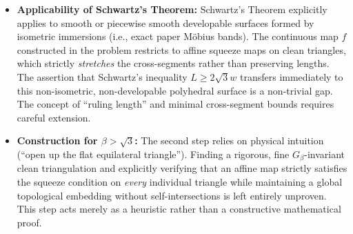 \documentclass[12pt]{article}
\begin{document}
\begin{itemize}
    \item \textbf{Applicability of Schwartz's Theorem:} Schwartz's Theorem explicitly applies to smooth or piecewise smooth developable surfaces formed by isometric immersions (i.e., exact paper M\"obius bands). The continuous map $f$ constructed in the problem restricts to affine squeeze maps on clean triangles, which strictly \emph{stretches} the cross-segments rather than preserving lengths. The assertion that Schwartz's inequality $L \ge 2\sqrt{3}w$ transfers immediately to this non-isometric, non-developable polyhedral surface is a non-trivial gap. The concept of ``ruling length'' and minimal cross-segment bounds requires careful extension.
    \item \textbf{Construction for $\beta > \sqrt{3}$:} The second step relies on physical intuition (``open up the flat equilateral triangle''). Finding a rigorous, fine $G_{\beta}$-invariant clean triangulation and explicitly verifying that an affine map strictly satisfies the squeeze condition on \emph{every} individual triangle while maintaining a global topological embedding without self-intersections is left entirely unproven. This step acts merely as a heuristic rather than a constructive mathematical proof.
\end{itemize}
\end{document}
